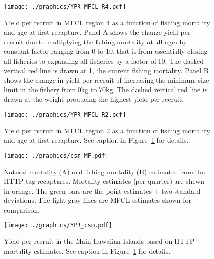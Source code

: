 \documentclass[12pt,letterpaper]{article}
\begin{document}
\begin{figure}
\begin{center}
\texttt{[image: ./graphics/YPR\_MFCL\_R4.pdf]}
\caption{\label{fig:r4ypr}
Yield per recruit in MFCL region 4 as a function of fishing mortality
and age at first recapture.
Panel A shows the change yield per recruit due to multiplying
the fishing mortality at all ages by constant factor ranging from 0 to
10, that is from essentially closing all fisheries to expanding all
fisheries by a factor of 10. 
The dashed vertical red line is drawn at 1, the current fishing mortality.
Panel B shows the change in yield per recruit of increasing
the minimum size limit in the fishery from 0kg to 70kg. 
The dashed vertical red line is drawn at the weight producing the
highest yield per recruit.
}
\end{center}
\end{figure}

\begin{figure}
\begin{center}
\texttt{[image: ./graphics/YPR\_MFCL\_R2.pdf]}
\caption{\label{fig:r2ypr}
Yield per recruit in MFCL region 2 as a function of fishing mortality
and age at first recapture. 
See caption in Figure~\ref{fig:r4ypr} for details.
}
\end{center}
\end{figure}

\begin{figure}
\begin{center}
\texttt{[image: ./graphics/csm\_MF.pdf]}
\caption{\label{fig:csmypr}
Natural mortality (A) and fishing mortality (B) estimates from the 
HTTP tag recaptures.
Mortality estimates (per quarter) are shown in orange.
The green bars are the point estimates $\pm$ two standard deviations.
The light gray lines are MFCL estimates shown for comparison.
}
\end{center}
\end{figure}

\begin{figure}
\begin{center}
\texttt{[image: ./graphics/YPR\_csm.pdf]}
\caption{\label{fig:csmmf}
Yield per recruit in the Main Hawaiian Islands based on HTTP mortality
estimates. 
See caption in Figure~\ref{fig:r4ypr} for details.
}
\end{center}
\end{figure}
\end{document}

